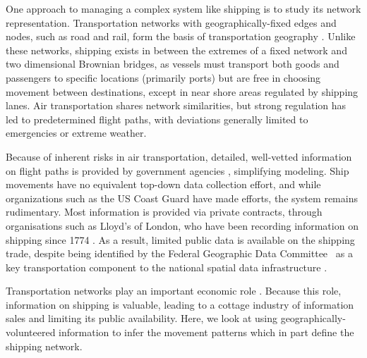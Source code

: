 \documentclass[12pt,letterpaper]{article}
\begin{document}


One approach to managing a complex system like shipping is to study its network representation.  Transportation networks with geographically-fixed edges and nodes, such as road and rail, form the basis of transportation geography \citep{Rodrigue2009}. Unlike these networks, shipping exists in between the extremes of a fixed network %
 and two dimensional Brownian bridges, as vessels must transport both goods and passengers to specific locations (primarily ports) but are free in choosing movement between destinations, except in near shore areas regulated by shipping lanes. Air transportation shares network similarities, but strong regulation has led to predetermined flight paths, with deviations generally limited to emergencies or extreme weather. %

Because of inherent risks in air transportation, detailed, well-vetted information on flight paths is provided by government agencies \citep{guimera2005worldwide}, simplifying modeling. Ship movements have no equivalent top-down data collection effort, and while organizations such as the US Coast Guard have made efforts, the system remains rudimentary. Most information is provided via private contracts, through organisations such as Lloyd's of London, who have been recording information on shipping since 1774 \citep{Lloyd'sRegister-FairplayLtd.2010}. As a result, limited public data is available on the shipping trade, despite being identified by the Federal Geographic Data Committee~\citep{FGDC} as a key transportation component to the national spatial data infrastructure \citep{CurrierInPress}.

Transportation networks play an important economic role \citep{canning1993effects}. Because this role, information on shipping is valuable, leading to a cottage industry of information sales and limiting its public availability. Here, we look at using geographically-volunteered information to infer the movement patterns which in part define the shipping network.
\end{document}
